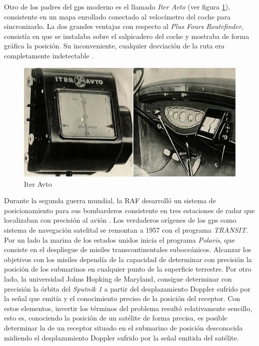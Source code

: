 Otro de los padres del gps moderno es el llamado \textit{Iter Avto} (ver figura \ref{fig:iter_avto}), consistente en un mapa enrollado conectado al velocímetro del coche para sincronizarlo. La dos grandes ventajas con respecto al \textit{Plus Fours Routefinder}, consistía en que se instalaba sobre el salpicadero del coche y mostraba de forma gráfica la posición. Su inconveniente, cualquier desviación de la ruta era completamente indetectable \cite{Parra13}.

\begin{figure}[h!btp]
\centering
\includegraphics[scale=0.5, fbox={\fboxrule} 4mm]{images/03-antecedentes/08-iter_avto.png}
\caption{Iter Avto}
\label{fig:iter_avto}
\end{figure}

Durante la segunda guerra mundial, la \ac{RAF} desarrolló un sistema de
posicionamiento para sus bombarderos consistente en tres estaciones de radar que localizaban
con precisión al avión \cite{Ori13}.
Los verdaderos orígenes de los gps como sistema de navegación satelital se remontan a 1957 con
el programa \textit{TRANSIT}. Por un lado la marina de los estados unidos inicia el programa \textit{Polaris},
que consiste en el despliegue de misiles transcontinentales suboceánicos. Alcanzar los objetivos
con los misiles dependía de la capacidad de determinar con precisión la posición de los
submarinos en cualquier punto de la superficie terrestre. Por otro lado, la universidad Johns
Hopking de Maryland, consigue determinar con precisión la órbita del \textit{Sputnik 1} a partir del
desplazamiento Doppler sufrido por la señal que emitía y el conocimiento preciso de la posición
del receptor. Con estos elementos, invertir los términos del problema resultó relativamente
sencillo, esto es, conociendo la posición de un satélite de forma precisa, es posible determinar
la de un receptor situado en el submarino de posición desconocida midiendo el desplazamiento
Doppler sufrido por la señal emitida del satélite.

